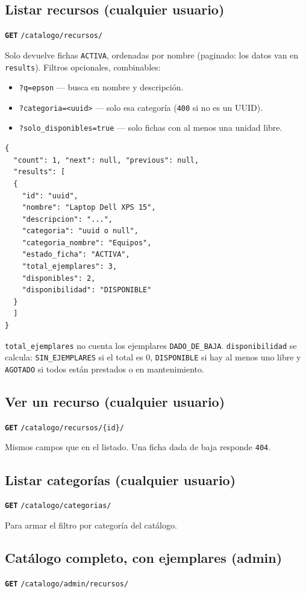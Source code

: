 \documentclass[11pt]{article}
\newcommand{\us}{\_\allowbreak}
\newcommand{\metodo}[2]{\textbf{\texttt{#1}} \texttt{#2}}
\begin{document}
\subsection*{Listar recursos (cualquier usuario)}
\metodo{GET}{/catalogo/recursos/}

Solo devuelve fichas \texttt{ACTIVA}, ordenadas por nombre (paginado: los datos van en \texttt{results}). Filtros opcionales, combinables:
\begin{itemize}
    \item \texttt{?q=epson} --- busca en nombre y descripci\'on.
    \item \texttt{?categoria=<uuid>} --- solo esa categor\'ia (\texttt{400} si no es un UUID).
    \item \texttt{?solo\us disponibles=true} --- solo fichas con al menos una unidad libre.
\end{itemize}
\begin{lstlisting}
{
  "count": 1, "next": null, "previous": null,
  "results": [
  {
    "id": "uuid",
    "nombre": "Laptop Dell XPS 15",
    "descripcion": "...",
    "categoria": "uuid o null",
    "categoria_nombre": "Equipos",
    "estado_ficha": "ACTIVA",
    "total_ejemplares": 3,
    "disponibles": 2,
    "disponibilidad": "DISPONIBLE"
  }
  ]
}
\end{lstlisting}
\texttt{total\us ejemplares} no cuenta los ejemplares \texttt{DADO\us DE\us BAJA}. \texttt{disponibilidad} se calcula: \texttt{SIN\us EJEMPLARES} si el total es 0, \texttt{DISPONIBLE} si hay al menos uno libre y \texttt{AGOTADO} si todos est\'an prestados o en mantenimiento.

\subsection*{Ver un recurso (cualquier usuario)}
\metodo{GET}{/catalogo/recursos/\{id\}/}

Mismos campos que en el listado. Una ficha dada de baja responde \texttt{404}.

\subsection*{Listar categor\'ias (cualquier usuario)}
\metodo{GET}{/catalogo/categorias/}

Para armar el filtro por categor\'ia del cat\'alogo.

\subsection*{Cat\'alogo completo, con ejemplares (admin)}
\metodo{GET}{/catalogo/admin/recursos/}
\end{document}

